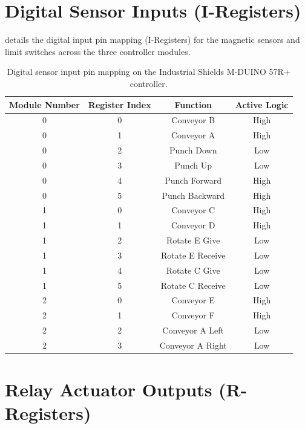 \section{Digital Sensor Inputs (I-Registers)}

 details the digital input pin mapping (I-Registers) for the magnetic sensors and limit switches across the three controller modules.

\begin{table}[htbp]
    \centering
    \caption{Digital sensor input pin mapping on the Industrial Shields M-DUINO 57R+ controller.}
    \label{tab:fms_sensor_inputs}
    \begin{tabular}{cccc}
        \toprule
        \textbf{Module Number} & \textbf{Register Index} & \textbf{Function} & \textbf{Active Logic} \\
        \midrule
        0 & 0 & Conveyor B & High \\
        0 & 1 & Conveyor A & High \\
        0 & 2 & Punch Down & Low \\
        0 & 3 & Punch Up & Low \\
        0 & 4 & Punch Forward & High \\
        0 & 5 & Punch Backward & High \\
        \midrule
        1 & 0 & Conveyor C & High \\
        1 & 1 & Conveyor D & High \\
        1 & 2 & Rotate E Give & Low \\
        1 & 3 & Rotate E Receive & Low \\
        1 & 4 & Rotate C Give & Low \\
        1 & 5 & Rotate C Receive & Low \\
        \midrule
        2 & 0 & Conveyor E & High \\
        2 & 1 & Conveyor F & High \\
        2 & 2 & Conveyor A Left & Low \\
        2 & 3 & Conveyor A Right & Low \\
        \bottomrule
    \end{tabular}
\end{table}

\section{Relay Actuator Outputs (R-Registers)}

